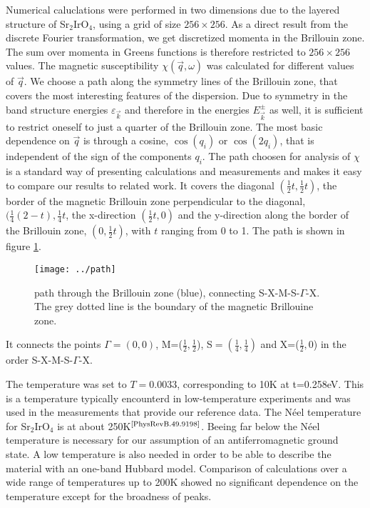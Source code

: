 \documentclass[a4paper,10pt]{report}
\begin{document}
Numerical caluclations were performed in two dimensions due to the layered structure of Sr$_2$IrO$_4$, 
using a grid of size $256\times256$.
As a direct result from the discrete Fourier transformation, we get discretized momenta in the Brillouin zone.
The sum over momenta in Greens functions is therefore restricted to $256\times256$ values.
The magnetic susceptibility $\chi(\vec q,\omega)$ was calculated for different values of $\vec q$.
We choose a path along the symmetry lines of the Brillouin zone, that covers the most interesting features of the dispersion.
Due to symmetry in the band structure energies $\varepsilon_{\vec k}$ and therefore in the energies $E^{\pm}_{\vec k}$ as well,
it is sufficient to restrict oneself to just a quarter of the Brillouin zone.
The most basic dependence on $\vec q$ is through a cosine, $\cos (q_i)$ or $\cos(2q_i)$, that is independent of the sign of the components $q_i$.
%
The path choosen for analysis of $\chi$ is a standard way of presenting calculations and measurements and makes it easy to compare our results to related work.
It covers the diagonal $(\frac12t,\frac12t)$, 
the border of the magnetic Brillouin zone perpendicular to the diagonal, $(\frac14(2-t),\frac14t$, 
the x-direction $(\frac12t,0)$ and the y-direction along the border of the Brillouin zone, $(0,\frac12t)$, with $t$ ranging from 0 to 1.
The path is shown in figure \ref{path}.
\begin{figure}
 \label{path}
 \begin{center}
  \texttt{[image: ../path]}
  \caption{path through the Brillouin zone (blue), connecting S-X-M-S-$\Gamma$-X. The grey dotted line is the boundary of the magnetic Brillouine zone.}
 \end{center}
\end{figure}
It connects the points $\Gamma=(0,0)$, M=($\frac12,\frac12$), S$=(\frac14,\frac14)$ and X=($\frac12,0$) in the order S-X-M-S-$\Gamma$-X.

The temperature was set to $T=0.0033$, corresponding to 10K at t=0.258eV.
This is a temperature  typically encounterd in low-temperature experiments and was used in the measurements that provide our reference data. 
The Néel temperature for Sr$_2$IrO$_4$ is at about 250K$^{\text{\cite{PhysRevB.49.9198}}}$.
Beeing far below the Néel temperature is necessary for our assumption of an antiferromagnetic ground state.
A low temperature is also needed in order to be able to describe the material with an one-band Hubbard model. 
Comparison of calculations over a wide range of temperatures up to 200K showed no significant dependence on the temperature except for the broadness of peaks.
\end{document}
